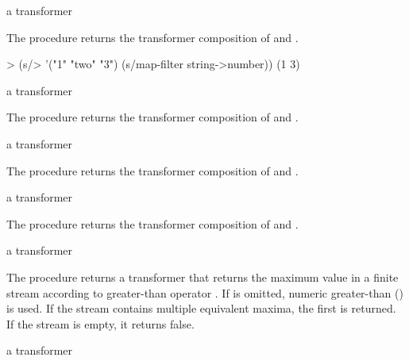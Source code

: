 \begin{procedure}
\end{procedure}
\returns{} a transformer

The  procedure returns the transformer composition of  and .

\codebegin
> (s/> '("1" "two" "3") (s/map-filter string->number))
(1 3)
\codeend

\begin{procedure}
\end{procedure}
\returns{} a transformer

The  procedure returns the transformer composition of  and .

\begin{procedure}
\end{procedure}
\returns{} a transformer

The  procedure returns the transformer composition of  and .

\begin{procedure}
\end{procedure}
\returns{} a transformer

The  procedure returns the transformer composition of  and .

\begin{procedure}
\end{procedure}
\returns{} a transformer

The  procedure returns a transformer that returns the maximum value in a
finite stream according to greater-than operator . If  is omitted, numeric
greater-than (\code{>}) is used. If the stream contains multiple equivalent maxima, the
first is returned. If the stream is empty, it returns false.

\begin{procedure}
\end{procedure}
\returns{} a transformer

